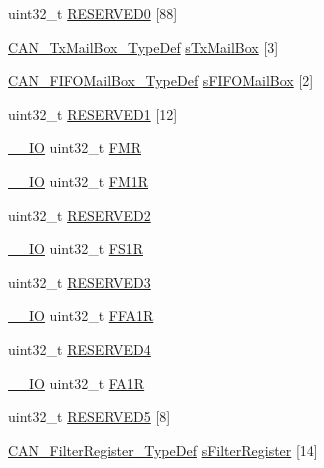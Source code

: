 \begin{DoxyCompactItemize}
\item 
uint32\+\_\+t \mbox{\hyperlink{struct_c_a_n___type_def_aae28ab86a4ae57ed057ed1ea89a6d34b}{R\+E\+S\+E\+R\+V\+E\+D0}} \mbox{[}88\mbox{]}
\item 
\mbox{\hyperlink{struct_c_a_n___tx_mail_box___type_def}{C\+A\+N\+\_\+\+Tx\+Mail\+Box\+\_\+\+Type\+Def}} \mbox{\hyperlink{struct_c_a_n___type_def_ae37503ab1a7bbd29846f94cdadf0a9ef}{s\+Tx\+Mail\+Box}} \mbox{[}3\mbox{]}
\item 
\mbox{\hyperlink{struct_c_a_n___f_i_f_o_mail_box___type_def}{C\+A\+N\+\_\+\+F\+I\+F\+O\+Mail\+Box\+\_\+\+Type\+Def}} \mbox{\hyperlink{struct_c_a_n___type_def_a21b030b34e131f7ef6ea273416449fe4}{s\+F\+I\+F\+O\+Mail\+Box}} \mbox{[}2\mbox{]}
\item 
uint32\+\_\+t \mbox{\hyperlink{struct_c_a_n___type_def_a4bb07a7828fbd5fe86f6a5a3545c177d}{R\+E\+S\+E\+R\+V\+E\+D1}} \mbox{[}12\mbox{]}
\item 
\mbox{\hyperlink{core__sc300_8h_aec43007d9998a0a0e01faede4133d6be}{\+\_\+\+\_\+\+IO}} uint32\+\_\+t \mbox{\hyperlink{struct_c_a_n___type_def_a1cb734df34f6520a7204c4c70634ebba}{F\+MR}}
\item 
\mbox{\hyperlink{core__sc300_8h_aec43007d9998a0a0e01faede4133d6be}{\+\_\+\+\_\+\+IO}} uint32\+\_\+t \mbox{\hyperlink{struct_c_a_n___type_def_aaa6f4cf1f16aaa6d17ec6c410db76acf}{F\+M1R}}
\item 
uint32\+\_\+t \mbox{\hyperlink{struct_c_a_n___type_def_a4c9b972a304c0e08ca27cbe57627c496}{R\+E\+S\+E\+R\+V\+E\+D2}}
\item 
\mbox{\hyperlink{core__sc300_8h_aec43007d9998a0a0e01faede4133d6be}{\+\_\+\+\_\+\+IO}} uint32\+\_\+t \mbox{\hyperlink{struct_c_a_n___type_def_aae0256ae42106ee7f87fc7e5bdb779d4}{F\+S1R}}
\item 
uint32\+\_\+t \mbox{\hyperlink{struct_c_a_n___type_def_af2b40c5e36a5e861490988275499e158}{R\+E\+S\+E\+R\+V\+E\+D3}}
\item 
\mbox{\hyperlink{core__sc300_8h_aec43007d9998a0a0e01faede4133d6be}{\+\_\+\+\_\+\+IO}} uint32\+\_\+t \mbox{\hyperlink{struct_c_a_n___type_def_af1405e594e39e5b34f9499f680157a25}{F\+F\+A1R}}
\item 
uint32\+\_\+t \mbox{\hyperlink{struct_c_a_n___type_def_ac0018930ee9f18afda25b695b9a4ec16}{R\+E\+S\+E\+R\+V\+E\+D4}}
\item 
\mbox{\hyperlink{core__sc300_8h_aec43007d9998a0a0e01faede4133d6be}{\+\_\+\+\_\+\+IO}} uint32\+\_\+t \mbox{\hyperlink{struct_c_a_n___type_def_aaf76271f4ab0b3deb3ceb6e2ac0d62d0}{F\+A1R}}
\item 
uint32\+\_\+t \mbox{\hyperlink{struct_c_a_n___type_def_a269f31b91d0f38a48061b76ecc346f55}{R\+E\+S\+E\+R\+V\+E\+D5}} \mbox{[}8\mbox{]}
\item 
\mbox{\hyperlink{struct_c_a_n___filter_register___type_def}{C\+A\+N\+\_\+\+Filter\+Register\+\_\+\+Type\+Def}} \mbox{\hyperlink{struct_c_a_n___type_def_a6f34c431b88ced05a7315dfd33b343b2}{s\+Filter\+Register}} \mbox{[}14\mbox{]}
\end{DoxyCompactItemize}


